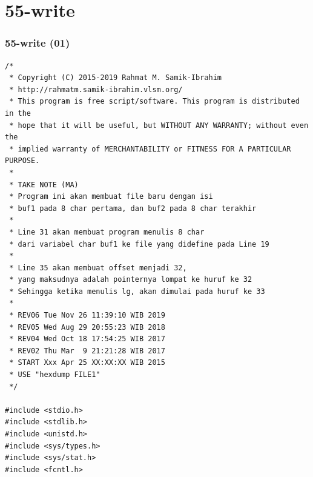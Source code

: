 \documentclass[aspectratio=169, xcolor=table, notheorems, hyperref={pdfpagelabels=false}]{beamer}
\begin{document}
\section{55-write}
\begin{frame}[fragile]
\frametitle{55-write (01)}
\begin{lstlisting}[basicstyle=\ttfamily\tiny]
/*
 * Copyright (C) 2015-2019 Rahmat M. Samik-Ibrahim
 * http://rahmatm.samik-ibrahim.vlsm.org/
 * This program is free script/software. This program is distributed in the 
 * hope that it will be useful, but WITHOUT ANY WARRANTY; without even the 
 * implied warranty of MERCHANTABILITY or FITNESS FOR A PARTICULAR PURPOSE.
 *
 * TAKE NOTE (MA)
 * Program ini akan membuat file baru dengan isi
 * buf1 pada 8 char pertama, dan buf2 pada 8 char terakhir
 *
 * Line 31 akan membuat program menulis 8 char 
 * dari variabel char buf1 ke file yang didefine pada Line 19
 *
 * Line 35 akan membuat offset menjadi 32,
 * yang maksudnya adalah pointernya lompat ke huruf ke 32
 * Sehingga ketika menulis lg, akan dimulai pada huruf ke 33
 *
 * REV06 Tue Nov 26 11:39:10 WIB 2019
 * REV05 Wed Aug 29 20:55:23 WIB 2018
 * REV04 Wed Oct 18 17:54:25 WIB 2017
 * REV02 Thu Mar  9 21:21:28 WIB 2017
 * START Xxx Apr 25 XX:XX:XX WIB 2015
 * USE "hexdump FILE1"
 */

#include <stdio.h>
#include <stdlib.h>
#include <unistd.h>
#include <sys/types.h>
#include <sys/stat.h>
#include <fcntl.h>

\end{lstlisting}
\end{frame}
\end{document}
